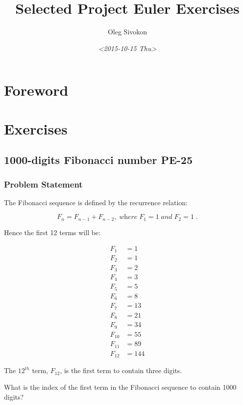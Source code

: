 \documentclass[11pt]{article}
\author{Oleg Sivokon}
\date{\textit{<2015-10-15 Thu>}}
\title{Selected Project Euler Exercises}
\begin{document}
\maketitle
\tableofcontents

\newpage

\section{Foreword}
\label{sec:orgheadline1}
\section{Exercises}
\label{sec:orgheadline18}
\subsection{1000-digits Fibonacci number PE-25}
\label{sec:orgheadline5}
\subsubsection{Problem Statement}
\label{sec:orgheadline2}
The Fibonacci sequence is defined by the recurrence relation:

\begin{equation*}
  F_n = F_{n-1} + F_{n-2},\; \textit{where}\; F_1 = 1\; \textit{and} \; F_2 = 1\;.
\end{equation*}


Hence the first 12 terms will be:

\begin{align*}
  F_1    &= 1   \\
  F_2    &= 1   \\
  F_3    &= 2   \\
  F_4    &= 3   \\
  F_5    &= 5   \\
  F_6    &= 8   \\
  F_7    &= 13  \\
  F_8    &= 21  \\
  F_9    &= 34  \\
  F_{10} &= 55  \\
  F_{11} &= 89  \\
  F_{12} &= 144
\end{align*}


The \(12^{th}\) term, \(F_{12}\), is the first term to contain three digits.

What is the index of the first term in the Fibonacci sequence 
to contain 1000 digits?
\end{document}
